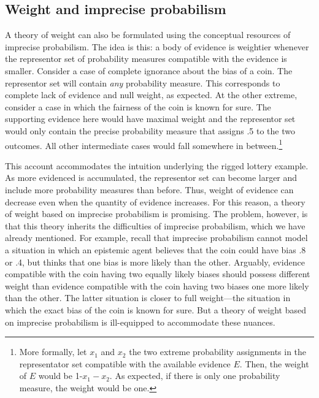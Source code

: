 \documentclass[
  10pt,
  dvipsnames,enabledeprecatedfontcommands]{scrartcl}
\begin{document}
\hypertarget{weight-and-imprecise-probabilism}{%
\subsection{Weight and imprecise
probabilism}\label{weight-and-imprecise-probabilism}}

A theory of weight can also be formulated using the conceptual resources
of imprecise probabilism.
 The idea is
this: a body of evidence is weightier whenever the representor set of
probability measures compatible with the evidence is smaller. Consider a
case of complete ignorance about the bias of a coin. The representor set
will contain \emph{any} probability measure. This corresponds to
complete lack of evidence and null weight, as expected. At the other
extreme, consider a case in which the fairness of the coin is known for
sure. The supporting evidence here would have maximal weight and the
representor set would only contain the precise probability measure that
assigns .5 to the two outcomes. All other intermediate cases would fall
somewhere in between.\footnote{More formally, let \(x_1\) and \(x_2\)
  the two extreme probability assignments in the representator set
  compatible with the available evidence \(E\). Then, the weight of
  \(E\) would be 1-\(x_1-x_2\). As expected, if there is only one
  probability measure, the weight would be one.}

This account accommodates the intuition underlying the rigged lottery
example. As more evidenced is accumulated, the representor set can
become larger and include more probability measures than before. Thus,
weight of evidence can decrease even when the quantity of evidence
increases. For this reason, a theory of weight based on imprecise
probabilism is promising. The problem, however, is that this theory
inherits the difficulties of imprecise probabilism, which we have
already mentioned. For example, recall that imprecise probabilism cannot
model a situation in which an epistemic agent believes that the coin
could have bias .8 or .4, but thinks that one bias is more likely than
the other. Arguably, evidence compatible with the coin having two
equally likely biases should possess different weight than evidence
compatible with the coin having two biases one more likely than the
other. The latter situation is closer to full weight---the situation in
which the exact bias of the coin is known for sure. But a theory of
weight based on imprecise probabilism is ill-equipped to accommodate
these nuances.
\end{document}
